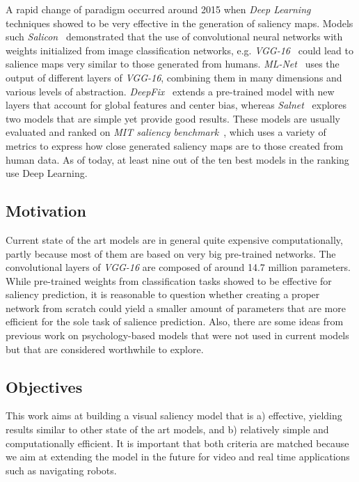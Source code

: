 \documentclass[12pt]{article}
\begin{document}
A rapid change of paradigm occurred around 2015 when \emph{Deep Learning}
techniques showed to be very effective in the generation of saliency
maps.
Models such \emph{Salicon}~\cite{jiang_2015} demonstrated that the use of 
convolutional neural networks with weights initialized from
image classification networks, e.g. \emph{VGG-16}~\cite{zisserman_2014}
could lead to salience maps very similar to those generated from humans.
\emph{ML-Net}~\cite{cornia_2016} uses the output of different layers
of \emph{VGG-16}, combining them in many dimensions and various levels of
abstraction. \emph{DeepFix}~\cite{kruthiventi_2015} extends a pre-trained model with
new layers that account for global features and center bias, whereas \emph{Salnet}~\cite{pan_2016} explores two models that are
simple yet provide good results. These models are usually evaluated and ranked on
\emph{MIT saliency benchmark}~\cite{mit_sal_bm}, which uses a variety of
metrics to express how close generated saliency maps are to those created from
human data. As of today, at least nine out of the ten best models in the ranking use
Deep Learning.

\subsection{Motivation}
Current state of the art models are in general quite expensive computationally,
partly because most of them are based on very big pre-trained networks.
The convolutional layers of \emph{VGG-16} are composed of around 14.7
million parameters.
While pre-trained weights from classification tasks showed to be effective
for saliency prediction, it is reasonable to question whether
creating a proper network from scratch could yield a smaller amount of
parameters that are more efficient for the sole task of salience prediction.
Also, there are some ideas from previous work on psychology-based models that were not
used in current models but that are considered worthwhile to explore.

\subsection{Objectives}
This work aims at building a visual saliency model that is a) effective,
yielding results similar to other state of the art models,
and b) relatively simple and computationally efficient.
It is important that both criteria are matched because we aim at extending the
model in the future for video and real time applications such as
navigating robots.
\end{document}
